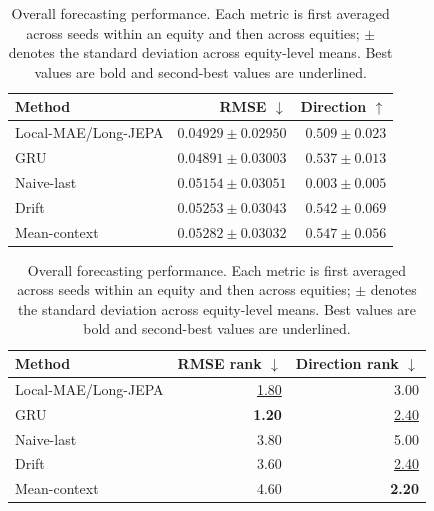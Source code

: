 \begin{table}[t]
\centering
\small
\caption{Overall forecasting performance. Each metric is first averaged across seeds within an equity and then across equities; $\pm$ denotes the standard deviation across equity-level means. Best values are bold and second-best values are underlined.}
\label{tab:main_metrics}
\begin{tabular}{lrr}
\toprule
Method & RMSE $\downarrow$ & Direction $\uparrow$ \\
\midrule
Local-MAE/Long-JEPA & \underline{$0.04929 \pm 0.02950$} & $0.509 \pm 0.023$ \\
GRU & \textbf{$0.04891 \pm 0.03003$} & $0.537 \pm 0.013$ \\
Naive-last & $0.05154 \pm 0.03051$ & $0.003 \pm 0.005$ \\
Drift & $0.05253 \pm 0.03043$ & \underline{$0.542 \pm 0.069$} \\
Mean-context & $0.05282 \pm 0.03032$ & \textbf{$0.547 \pm 0.056$} \\
\bottomrule
\end{tabular}
\par\medskip
\begin{tabular}{lrr}
\toprule
Method & RMSE rank $\downarrow$ & Direction rank $\downarrow$ \\
\midrule
Local-MAE/Long-JEPA & \underline{1.80} & 3.00 \\
GRU & \textbf{1.20} & \underline{2.40} \\
Naive-last & 3.80 & 5.00 \\
Drift & 3.60 & \underline{2.40} \\
Mean-context & 4.60 & \textbf{2.20} \\
\bottomrule
\end{tabular}
\end{table}
